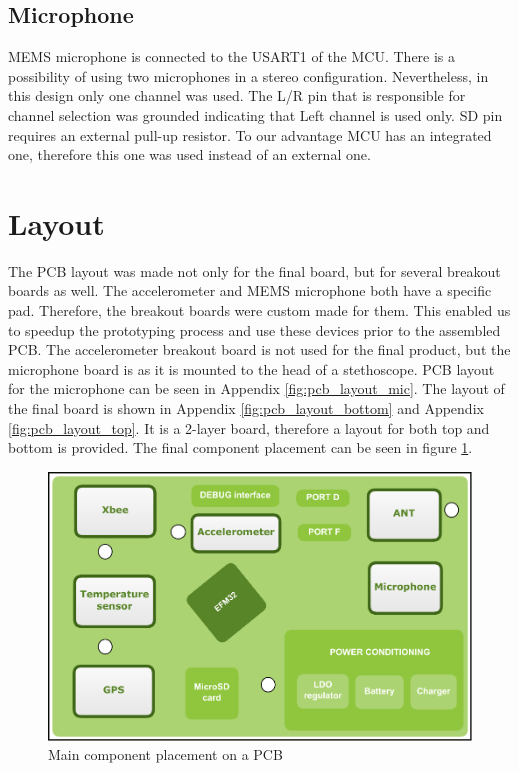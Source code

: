 \subsection{Microphone}
MEMS microphone is connected to the USART1 of the MCU. There is a possibility of using two microphones in a stereo configuration. Nevertheless, in this design only one channel was used. The L/R pin that is responsible for channel selection was grounded indicating that Left channel is used only. SD pin requires an external pull-up resistor. To our advantage MCU has an integrated one, therefore this one was used instead of an external one.


\section{Layout}
The PCB layout was made not only for the final board, but for several breakout boards as well. The accelerometer and MEMS microphone both have a specific pad. Therefore, the breakout boards were custom made for them. This enabled us to speedup the prototyping process and use these devices prior to the assembled PCB. The accelerometer breakout board is not used for the final product, but the microphone board is as it is mounted to the head of a stethoscope. PCB layout for the microphone can be seen in Appendix \ref{fig:pcb_layout_mic}. The layout of the final board is shown in  Appendix \ref{fig:pcb_layout_bottom} and Appendix \ref{fig:pcb_layout_top}. It is a 2-layer board, therefore a layout for both top and bottom is provided.
The final component placement can be seen in figure \ref{fig:board_layout}. 

\begin{figure}[!htb]
\centering
\includegraphics[width=\textwidth]{Images/board_layout}
\caption{Main component placement on a PCB}
\label{fig:board_layout}
\end{figure}

